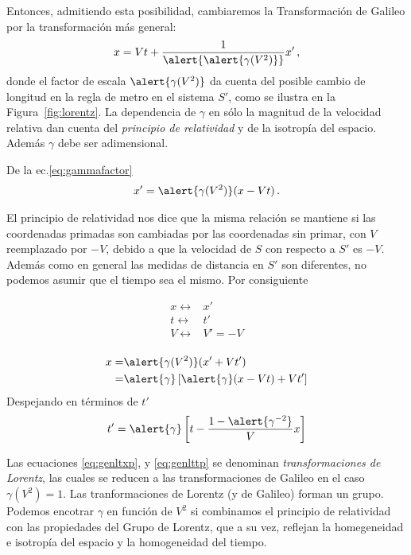 \begin{frame}
Entonces, admitiendo esta posibilidad, cambiaremos la Transformación de Galileo por la transformación más general:
\begin{align}
  \label{eq:gammafactor}
  x=Vt+\frac{1}{\alert{\alert{\gamma(V^2)}}} x'\,,
\end{align}
donde el factor de escala $\alert{\gamma(V^2)}$ da cuenta del posible cambio de longitud en la regla de metro en el sistema $S'$, como se ilustra en la Figura~\ref{fig:lorentz}. 
La dependencia de $\gamma$ en sólo la magnitud de la velocidad relativa dan cuenta del \emph{principio de relatividad} y de la isotropía del espacio. Además $\gamma$ debe ser adimensional.

De la ec.\eqref{eq:gammafactor}
\begin{align}
\label{eq:genltxp}
  x'=\alert{\gamma(V^2)}(x-V t)\,.
\end{align}
\begin{details}
El principio de relatividad nos dice que la misma relación se mantiene si las coordenadas primadas son cambiadas por las coordenadas sin primar, con $V$ reemplazado por $-V$, debido a que la velocidad de $S$ con respecto a $S'$ es $-V$. Además como en general las medidas de distancia en $S'$ son diferentes, no podemos asumir que el tiempo sea el mismo. Por consiguiente
\end{details}
\begin{onlybeamer}
  \begin{align*}
    x\longleftrightarrow& x'\\
    t\longleftrightarrow& t'\\
    V\longleftrightarrow& V'=-V\\
  \end{align*}
\end{onlybeamer}
\begin{align*}
    x=&\alert{\gamma(V^2)}(x'+V t')\nonumber\\
    =&\alert{\gamma}\left[\alert{\gamma}(x-V t)+V t'\right]
\end{align*}
Despejando en términos de $t'$ %
\begin{align}
  \label{eq:genlttp}
  t'=\alert{\gamma}\left[t-\frac{1-\alert{\gamma^{-2}}}{V}x\right]
\end{align}

\begin{details}
  Las ecuaciones \eqref{eq:genltxp}, y \eqref{eq:genlttp} se denominan
\emph{transformaciones de Lorentz}, las cuales se reducen a las
transformaciones de Galileo en el caso $\gamma(V^2)=1$. Las
tranformaciones de Lorentz (y de Galileo) forman un grupo. Podemos
encotrar $\gamma$ en función de $V^2$ si combinamos el principio de
relatividad con las propiedades del Grupo de Lorentz, que a su vez,
reflejan la homegeneidad e isotropía del espacio y la homogeneidad del
tiempo. 


\end{details}
\end{frame}
